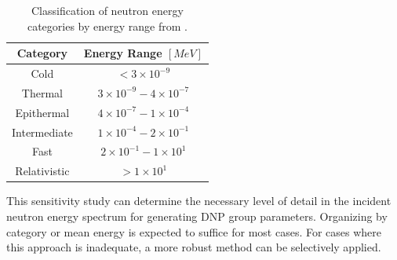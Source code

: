 \begin{table}[H]
    \centering
    \caption{Classification of neutron energy categories by energy range from \cite{l2003nuclear}.}
    \begin{tabular}{cc}
    \hline
        Category & Energy Range $[MeV]$ \\
    \hline
      Cold   & $< 3 \times 10^{-9}$ \\
      Thermal & $3 \times 10^{-9} - 4 \times 10^{-7}$ \\
      Epithermal & $4 \times 10^{-7} - 1 \times 10^{-4}$ \\
      Intermediate & $1 \times 10^{-4} - 2 \times 10^{-1}$ \\
      Fast & $2 \times 10^{-1} - 1 \times 10^1$ \\
      Relativistic & $> 1 \times 10^1$ \\
    \hline
    \end{tabular}
    \label{tab:neutronenergyspectra}
\end{table}

This sensitivity study can determine the necessary level of detail in the incident neutron energy spectrum for generating \gls{DNP} group parameters.
Organizing by category or mean energy is expected to suffice for most cases.
For cases where this approach is inadequate, a more robust method can be selectively applied.
